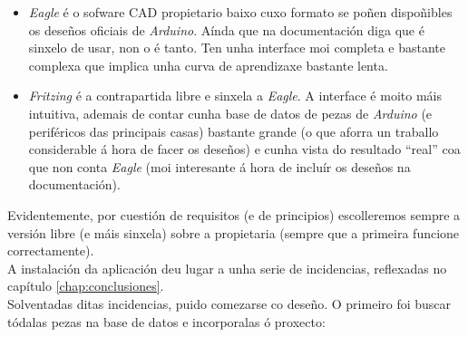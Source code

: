   \begin{itemize}
   \item \textit{Eagle} é o sofware CAD propietario baixo cuxo formato se poñen
         dispoñibles os deseños oficiais de \textit{Arduino}. Aínda que na
         documentación diga que é sinxelo de usar, non o é tanto. Ten unha
         interface moi completa e bastante complexa que implica unha curva de
         aprendizaxe bastante lenta.
   \item \textit{Fritzing} é a contrapartida libre e sinxela a \textit{Eagle}.
         A interface é moito máis intuitiva, ademais de contar cunha base de
         datos de pezas de \textit{Arduino} (e periféricos das principais
         casas) bastante grande (o que aforra un traballo considerable á hora
         de facer os deseños) e cunha vista do resultado ``real'' coa que non
         conta \textit{Eagle} (moi interesante á hora de incluír os deseños na
         documentación).
  \end{itemize}

  Evidentemente, por cuestión de requisitos (e de principios) escolleremos
  sempre a versión libre (e máis sinxela) sobre a propietaria (sempre que a
  primeira funcione correctamente). \\

  A instalación da aplicación deu lugar a unha serie de incidencias, reflexadas
  no capítulo \ref{chap:conclusiones}. \\

  Solventadas ditas incidencias, puido comezarse co deseño. O primeiro foi
  buscar tódalas pezas na base de datos e incorporalas ó proxecto:

